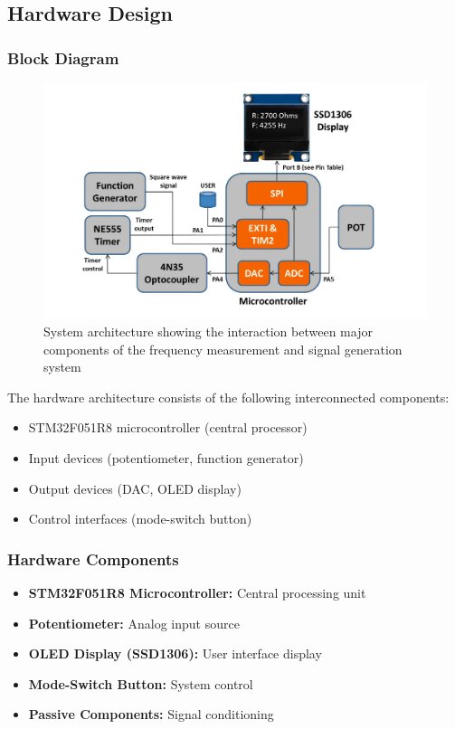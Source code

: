 

\subsection{Hardware Design}

\subsubsection{Block Diagram}
\begin{figure}[tbph]
  \centering
  \includegraphics[width=0.7\linewidth]{graphics/system_blocks}
  \caption{System architecture showing the interaction between major components of the frequency measurement and signal generation system}
  \label{fig:systemblocks}
\end{figure}

The hardware architecture consists of the following interconnected components:
\begin{itemize}
    \item STM32F051R8 microcontroller (central processor)
    \item Input devices (potentiometer, function generator)
    \item Output devices (DAC, OLED display)
    \item Control interfaces (mode-switch button)
\end{itemize}

\subsubsection{Hardware Components}
\begin{itemize}
    \item \textbf{STM32F051R8 Microcontroller:} Central processing unit
    \item \textbf{Potentiometer:} Analog input source
    \item \textbf{OLED Display (SSD1306):} User interface display
    \item \textbf{Mode-Switch Button:} System control
    \item \textbf{Passive Components:} Signal conditioning
\end{itemize}

